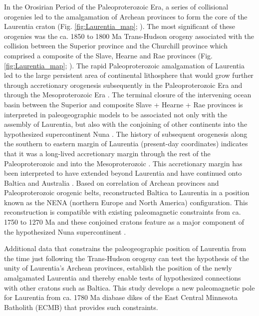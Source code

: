 \documentclass[draft]{agujournal2019}
\begin{document}
In the Orosirian Period of the Paleoproterozoic Era, a series of collisional orogenies led to the amalgamation of Archean provinces to form the core of the Laurentia craton (Fig. \ref{fig:Laurentia_map}; ). The most significant of these orogenies was the ca. 1850 to 1800 Ma Trans-Hudson orogeny associated with the collision between the Superior province and the Churchill province which comprised a composite of the Slave, Hearne and Rae provinces (Fig. \ref{fig:Laurentia_map}; ). The rapid Paleoproterozoic amalgamation of Laurentia led to the large persistent area of continental lithosphere that would grow further through accretionary orogenesis subsequently in the Paleoproterozoic Era and through the Mesoproterozoic Era \cite{Whitmeyer2007a}. The terminal closure of the intervening ocean basin between the Superior and composite Slave + Hearne + Rae provinces is interpreted in paleogeographic models to be associated not only with the assembly of Laurentia, but also with the conjoining of other continents into the hypothesized supercontinent Nuna \cite{Pehrsson2015a}. The history of subsequent orogenesis along the southern to eastern margin of Laurentia (present-day coordinates) indicates that it was a long-lived accretionary margin through the rest of the Paleoproterozoic and into the Mesoproterozoic \cite{Karlstrom2001a, Whitmeyer2007a}. This accretionary margin has been interpreted to have extended beyond Laurentia and have continued onto Baltica and Australia \cite{Karlstrom2001a}. Based on correlation of Archean provinces and Paleoproterozoic orogenic belts,  reconstructed Baltica to Laurentia in a position known as the NENA (northern Europe and North America) configuration. This reconstruction is compatible with existing paleomagnetic constraints from ca. 1750 to 1270 Ma \cite{Evans2008a} and these conjoined cratons feature as a major component of the hypothesized Nuna supercontinent \cite{Evans2011a, Zhang2012a}. 

Additional data that constrains the paleogeographic position of Laurentia from the time just following the Trans-Hudson orogeny can test the hypothesis of the unity of Laurentia's Archean provinces, establish the position of the newly amalgamated Laurentia and thereby enable tests of hypothesized connections with other cratons such as Baltica. This study develops a new paleomagnetic pole for Laurentia from ca. 1780 Ma diabase dikes of the East Central Minnesota Batholith (ECMB) that provides such constraints.
\end{document}
